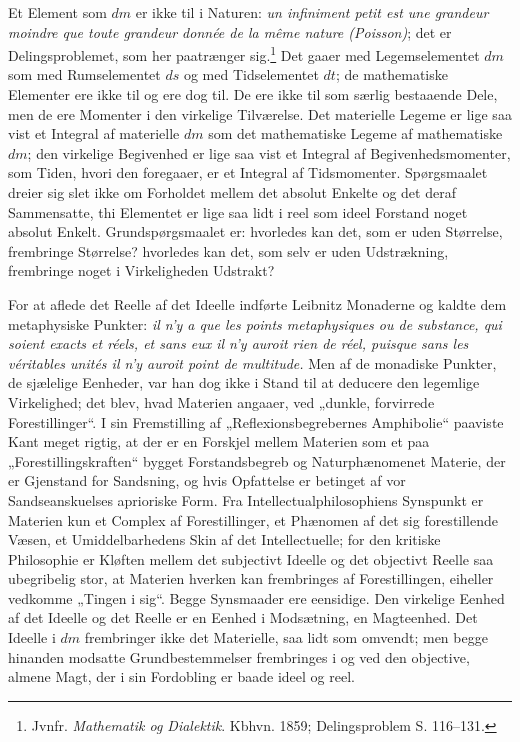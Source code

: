 \documentclass[12pt,a4paper]{book}
\begin{document}
Et Element som $dm$ er ikke til i Naturen: \textit{un infiniment petit
est une grandeur moindre que toute grandeur donnée de la même nature
(Poisson)}; det er Delingsproblemet, som her paatrænger
sig.\footnote{%
Jvnfr. \emph{Mathematik og Dialektik}. Kbhvn. 1859; Delingsproblem
S. 116--131.}
Det gaaer med Legemselementet $dm$ som med Rumselementet $ds$ og med
Tidselementet $dt$; de mathematiske Elementer ere ikke til og ere dog
til. De ere ikke til som særlig bestaaende Dele, men de ere Momenter i
den virkelige Tilværelse. Det materielle Legeme er lige saa vist et
Integral af materielle $dm$ som det mathematiske Legeme af mathematiske
$dm$; den virkelige Begivenhed er lige saa vist et Integral af
Begivenhedsmomenter, som Tiden, hvori den foregaaer, er et Integral af
Tidsmomenter. Spørgsmaalet dreier sig slet ikke om Forholdet mellem
det absolut Enkelte og det deraf Sammensatte, thi Elementet er lige saa
lidt i reel som ideel Forstand noget absolut Enkelt. Grundspørgsmaalet
er: hvorledes kan det, som er uden Størrelse, frembringe Størrelse?
hvorledes kan det, som selv er uden Udstrækning, frembringe noget i
Virkeligheden Udstrakt?

For at aflede det Reelle af det Ideelle indførte Leibnitz Monaderne og
kaldte dem metaphysiske Punkter:
\textit{il n'y a que les points metaphysiques ou de substance, qui
soient exacts et réels, et sans eux il n'y auroit rien de réel,
puisque sans les véritables unités il n'y auroit point de multitude.}
Men af de monadiske Punkter, de sjælelige Eenheder, var
han dog ikke i Stand til at deducere den legemlige Virkelighed; det
blev, hvad Materien angaaer, ved „dunkle, forvirrede Forestillinger“.
I sin Fremstilling af „Reflexionsbegrebernes Amphibolie“ paaviste Kant
meget rigtig, at der er en Forskjel mellem Materien som et paa
„Forestillingskraften“ bygget Forstandsbegreb og Naturphænomenet
Materie, der er Gjenstand for Sandsning, og hvis Opfattelse er betinget
af vor Sandseanskuelses aprioriske Form. Fra Intellectualphilosophiens
Synspunkt er Materien kun et Complex af Forestillinger, et Phænomen af
det sig forestillende Væsen, et Umiddelbarhedens Skin af det
Intellectuelle; for den kritiske Philosophie er Kløften mellem det
subjectivt Ideelle og det objectivt Reelle saa ubegribelig stor, at
Materien hverken kan frembringes af Forestillingen, eiheller vedkomme
„Tingen i sig“. Begge Synsmaader ere eensidige. Den virkelige Eenhed
af det Ideelle og det Reelle er en Eenhed i Modsætning, en Magteenhed.
Det Ideelle i $dm$ frembringer ikke det Materielle, saa lidt som
omvendt; men begge hinanden modsatte Grundbestemmelser frembringes i og
ved den objective, almene Magt, der i sin Fordobling er baade ideel og
reel.
\end{document}
